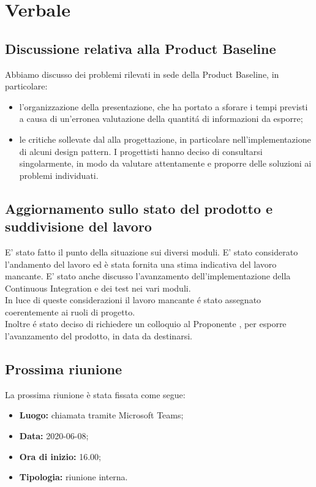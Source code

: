 \section{Verbale}
\subsection{Discussione relativa alla Product Baseline}
	Abbiamo discusso dei problemi rilevati in sede della Product Baseline, in particolare:
	\begin{itemize}
		\item l'organizzazione della presentazione, che ha portato a sforare i tempi previsti a causa di un'erronea valutazione della quantitá di informazioni da esporre;
		\item le critiche sollevate dal \RC{} alla progettazione, in particolare nell'implementazione di alcuni design pattern. I progettisti hanno deciso di consultarsi singolarmente, in modo da valutare attentamente e proporre delle soluzioni ai problemi individuati.
	\end{itemize}
\subsection{Aggiornamento sullo stato del prodotto e suddivisione del lavoro}
E’ stato fatto il punto della situazione sui diversi moduli. E' stato considerato l’andamento del lavoro ed è stata fornita una stima indicativa del lavoro mancante. E’ stato anche discusso l'avanzamento dell'implementazione della Continuous Integration e dei test nei vari moduli.\\ In luce di queste considerazioni il lavoro mancante é stato assegnato coerentemente ai ruoli di progetto.\\ Inoltre é stato deciso di richiedere un colloquio al Proponente \Proponente{}, per esporre l'avanzamento del prodotto, in data da destinarsi.
	\subsection{Prossima riunione}
		La prossima riunione è stata fissata come segue:
		\begin{itemize}
			\item \textbf{Luogo:} chiamata tramite Microsoft Teams;
			\item \textbf{Data:} 2020-06-08;
			\item \textbf{Ora di inizio:} 16.00;
			\item \textbf{Tipologia:} riunione interna.
		\end{itemize}
